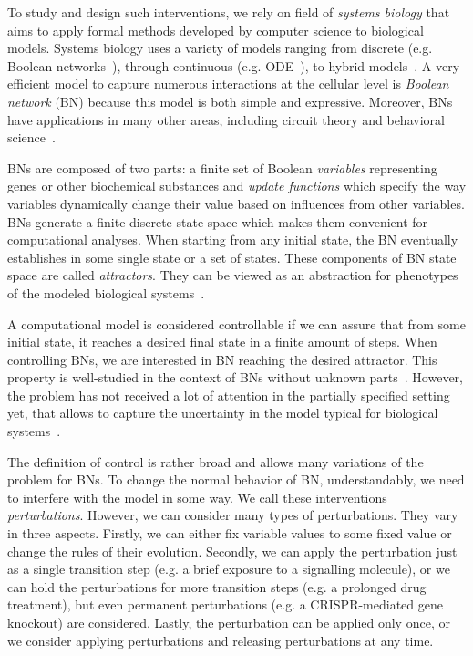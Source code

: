 To study and design such interventions, we rely on field of \emph{systems biology} that aims to apply formal methods developed by computer science to biological models. Systems biology uses a variety of models ranging from discrete (e.g. Boolean networks~\cite{Schwab2020}), through continuous (e.g. ODE~\cite{Gratie2013}), to hybrid models~\cite{Grossman1993}. A very efficient model to capture numerous interactions at the cellular level is \emph{Boolean network} (BN) because this model is both simple and expressive. Moreover, BNs have applications in many other areas, including circuit theory and behavioral science~\cite{Roli2015, Kochemazov2014}. 

BNs are composed of two parts: a finite set of Boolean \emph{variables} representing genes or other biochemical substances and \emph{update functions} which specify the way variables dynamically change their value based on influences from other variables. BNs generate a finite discrete state-space which makes them convenient for computational analyses. When starting from any initial state, the BN eventually establishes in some single state or a set of states. These components of BN state space are called \emph{attractors}. They can be viewed as an abstraction for phenotypes of the modeled biological systems~\cite{Cheng2016}.


A computational model is considered controllable if we can assure that from some initial state, it reaches a desired final state in a finite amount of steps. When controlling BNs, we are interested in BN reaching the desired attractor. This property is well-studied in the context of BNs without unknown parts~\cite{Zanudo2015, Mandon2019CMSB, Su2020BCB, Fontanals2020}. However, the problem has not received a lot of attention in the partially specified setting yet, that allows to capture the uncertainty in the model typical for biological systems~\cite{Zou2013, Benes2019}. 

The definition of control is rather broad and allows many variations of the problem for BNs. To change the normal behavior of BN, understandably, we need to interfere with the model in some way. We call these interventions \emph{perturbations}. However, we can consider many types of perturbations. They vary in three aspects. Firstly, we can either fix variable values to some fixed value or change the rules of their evolution. Secondly, we can apply the perturbation just as a single transition step (e.g. a brief exposure to a signalling molecule), or we can hold the perturbations for more transition steps (e.g. a prolonged drug treatment), but even permanent perturbations (e.g. a CRISPR-mediated gene knockout) are considered. Lastly, the perturbation can be applied only once, or we consider applying perturbations and releasing perturbations at any time.

